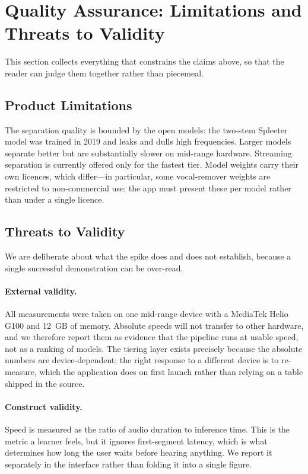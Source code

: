 \documentclass[letterpaper]{article} %
\begin{document}
\section{Quality Assurance: Limitations and Threats to Validity}

This section collects everything that constrains the claims above, so that the
reader can judge them together rather than piecemeal.

\subsection{Product Limitations}

The separation quality is bounded by the open models: the two-stem Spleeter
model was trained in 2019 and leaks and dulls high frequencies. Larger models
separate better but are substantially slower on mid-range hardware. Streaming
separation is currently offered only for the fastest tier. Model weights carry
their own licences, which differ---in particular, some vocal-remover weights
are restricted to non-commercial use; the app must present these per model
rather than under a single licence.

\subsection{Threats to Validity}

We are deliberate about what the spike does and does not establish, because a
single successful demonstration can be over-read.

\paragraph{External validity.} All measurements were taken on one mid-range
device with a MediaTek Helio G100 and 12~GB of memory. Absolute speeds will
not transfer to other hardware, and we therefore report them as evidence that
the pipeline runs at usable speed, not as a ranking of models. The tiering
layer exists precisely because the absolute numbers are device-dependent;
the right response to a different device is to re-measure, which the
application does on first launch rather than relying on a table shipped in the
source.

\paragraph{Construct validity.} Speed is measured as the ratio of audio
duration to inference time. This is the metric a learner feels, but it ignores
first-segment latency, which is what determines how long the user waits before
hearing anything. We report it separately in the interface rather than folding
it into a single figure.
\end{document}
